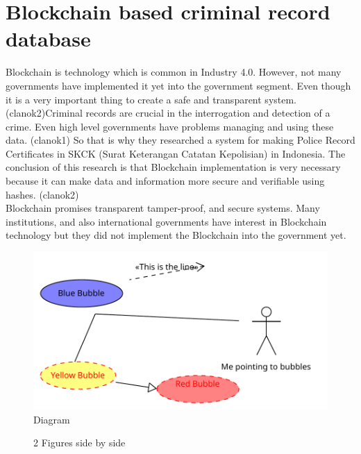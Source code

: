 \documentclass[10pt,english,a4paper]{article}
\begin{document}
  

\section{Blockchain based criminal record database}

Blockchain is technology which is common in Industry 4.0. However, not many governments have implemented it yet into the government segment. Even though it is a very important thing to create a safe and transparent system. \cite{Suroso:SKCK}(clanok2)Criminal records are crucial in the interrogation and detection of a crime. Even high level governments have problems managing and using these data. \cite{Jain:Criminal:record}(clanok1)  So that is why they researched a system for making Police Record Certificates in SKCK (Surat Keterangan Catatan Kepolisian) in Indonesia.  The conclusion of this research is that Blockchain implementation is very necessary because it can make data and information more secure and verifiable using hashes. \cite{Suroso:SKCK}(clanok2)
\\
Blockchain promises transparent tamper-proof, and secure systems. Many institutions, and also international governments have interest in Blockchain technology but they did not implement the Blockchain into the government yet.\cite{Suroso:SKCK} 
		

  \begin{figure}[h]
  \centering
   \includegraphics[scale=0.8]{Diagram_1.pdf}
  \centering
  \caption{Diagram}
 \end{figure}
 \lipsum[1-2]
 
 \begin{figure}%
    \centering
    \qquad
    \caption{2 Figures side by side}%
    \label{fig:example}%
\end{figure}
 
\end{document}
